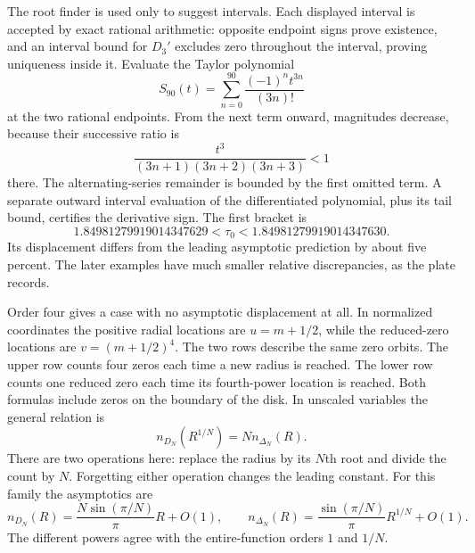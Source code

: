 The root finder is used only to suggest intervals. Each displayed interval is accepted by exact rational arithmetic: opposite endpoint signs prove existence, and an interval bound for $D_3'$ excludes zero throughout the interval, proving uniqueness inside it.
Evaluate the Taylor polynomial
\[
S_{90}(t)=\sum_{n=0}^{90}\frac{(-1)^nt^{3n}}{(3n)!}
\]
at the two rational endpoints. From the next term onward, magnitudes decrease, because their successive ratio is
\[
\frac{t^3}{(3n+1)(3n+2)(3n+3)}<1
\]
there. The alternating-series remainder is bounded by the first omitted term. A separate outward interval evaluation of the differentiated polynomial, plus its tail bound, certifies the derivative sign.
The first bracket is
\[
1.84981279919014347629<\tau_0<1.84981279919014347630.
\]
Its displacement differs from the leading asymptotic prediction by about five percent. The later examples have much smaller relative discrepancies, as the plate records.

Order four gives a case with no asymptotic displacement at all. In normalized coordinates the positive radial locations are $u=m+1/2$, while the reduced-zero locations are $v=(m+1/2)^4$.
The two rows describe the same zero orbits. The upper row counts four zeros each time a new radius is reached. The lower row counts one reduced zero each time its fourth-power location is reached. Both formulas include zeros on the boundary of the disk.
In unscaled variables the general relation is
\[
n_{D_N}(R^{1/N})=Nn_{\Delta_N}(R).
\]
There are two operations here: replace the radius by its $N$th root and divide the count by $N$. Forgetting either operation changes the leading constant.
For this family the asymptotics are
\[
n_{D_N}(R)=\frac{N\sin(\pi/N)}\pi R+O(1),\qquad
n_{\Delta_N}(R)=\frac{\sin(\pi/N)}\pi R^{1/N}+O(1).
\]
The different powers agree with the entire-function orders $1$ and $1/N$.

